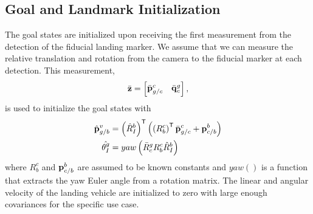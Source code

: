 
\subsection{Goal and Landmark Initialization}
The goal states are initialized upon receiving the first measurement from
the detection of the fiducial landing marker. We assume that we can measure the
relative translation and rotation from the camera to the fiducial marker
at each detection. This measurement,
\begin{equation}
  \bar{\vect{z}} =
  \begin{bmatrix}
    \bar{\vect{p}}_{g/c}^c & \bar{\vect{q}}_c^g
  \end{bmatrix},
  \label{eq:fiducial_meas}
\end{equation}
is used to initialize the goal states with
\begin{align}
  \hat{\boldsymbol{\mathrm{p}}}_{g/b}^v &= \left( \hat{R}_I^b \right)^{\mathsf{T}} \left( \left ( R_b^c
  \right)^{\mathsf{T}} \bar{\boldsymbol{\mathrm{p}}}_{g/c}^c + \boldsymbol{\mathrm{p}}_{c/b}^b
\right)   \\
      \hat{\theta_I^g} &= yaw \left( \bar{R}_c^g R_b^c \hat{R}_I^b \right)
\end{align}
where $R_b^c$ and $\boldsymbol{\mathrm{p}}_{c/b}^b$ are assumed to be known constants and
$yaw()$ is a function that extracts the yaw Euler angle from a rotation matrix.
The linear and angular velocity of the landing vehicle are initialized to
zero with large enough covariances for the specific use case.

